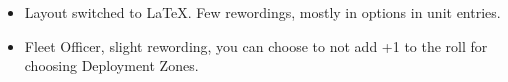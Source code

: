 
\subtitle{Layout}

\begin{itemize}[label={-}]
\item Layout switched to LaTeX. Few rewordings, mostly in options in unit entries.
\end{itemize}

%

%

\subtitle{Honours}

\begin{itemize}[label={-}]
\item Fleet Officer, slight rewording, you can choose to not add +1 to the roll for choosing Deployment Zones.
\end{itemize}

%

%

%

%

%

%

%
